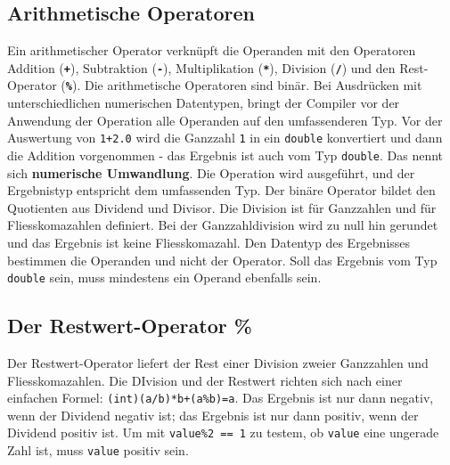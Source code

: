 \subsection{Arithmetische Operatoren}
Ein arithmetischer Operator verknüpft die Operanden mit den Operatoren Addition (\textbf{\texttt{+}}), Subtraktion (\textbf{\texttt{-}}), Multiplikation (\textbf{\texttt{*}}), Division (\textbf{\texttt{/}}) und den Rest-Operator (\textbf{\texttt{\%}}). Die arithmetische Operatoren sind binär.
\newline\newline
Bei Ausdrücken mit unterschiedlichen numerischen Datentypen, bringt der Compiler vor der Anwendung der Operation alle Operanden auf den umfassenderen Typ. Vor der Auswertung von \texttt{1+2.0} wird die Ganzzahl \texttt{1} in ein \texttt{double} konvertiert und dann die Addition vorgenommen - das Ergebnis ist auch vom Typ \texttt{double}. Das nennt sich \textbf{numerische Umwandlung}. Die Operation wird ausgeführt, und der Ergebnistyp entspricht dem umfassenden Typ.
\newline\newline
Der binäre Operator bildet den Quotienten aus Dividend und Divisor. Die Division ist für Ganzzahlen und für Fliesskomazahlen definiert. Bei der Ganzzahldivision wird zu null hin gerundet und das Ergebnis ist keine Fliesskomazahl. Den Datentyp des Ergebnisses bestimmen die Operanden und nicht der Operator. Soll das Ergebnis vom Typ \texttt{double} sein, muss mindestens ein Operand ebenfalls  sein.
\subsection{Der Restwert-Operator \%}
Der Restwert-Operator liefert der Rest einer Division zweier Ganzzahlen und Fliesskomazahlen. Die DIvision und der Restwert richten sich nach einer einfachen Formel: \texttt{(int)(a/b)*b+(a\%b)=a}. Das Ergebnis ist nur dann negativ, wenn der Dividend negativ ist; das Ergebnis ist nur dann positiv, wenn der Dividend positiv ist. Um mit \texttt{value\%2 == 1} zu testem, ob \texttt{value} eine ungerade Zahl ist, muss \texttt{value} positiv sein.
